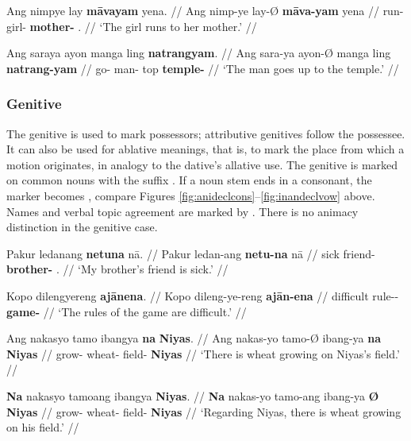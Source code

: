 \pex
\a\label{ex:datloc}\begingl
	\gla Ang nimpye lay \textbf{māvayam} yena. //
	\glb Ang nimp-ye lay-Ø \textbf{māva-yam} yena //
	\glc \AgtT{} run-\TsgF{} girl-\Top{} \textbf{mother-\Dat{}} 
		\TsgF{}.\Gen{} //
	\glft `The girl runs to her mother.' //
\endgl

\a\label{ex:datlocprep}\begingl
	\gla Ang saraya ayon manga ling \textbf{natrangyam}. //
	\glb Ang sara-ya ayon-Ø manga ling \textbf{natrang-yam} //
	\glc \AgtT{} go-\TsgM{} man-\Top{} \Dyn{} top \textbf{temple-\Dat{}} //
	\glft `The man goes up to the temple.' //
\endgl

\xe


\subsubsection{Genitive}
\label{subsubsec:genitive}

The genitive is used to mark possessors; attributive genitives follow the 
possessee. It can also be used for ablative meanings, that is, to mark the 
place from which a motion originates, in analogy to the dative's allative use. 
The genitive is marked on common nouns with the suffix . If a 
noun stem ends in a consonant, the marker becomes , compare 
Figures \ref{fig:anideclcons}–\ref{fig:inandeclvow} above. Names and verbal 
topic agreement are marked by . There is no animacy distinction in 
the genitive case.

\pex
\a\begingl
	\gla Pakur ledanang \textbf{netuna} nā. //
	\glb Pakur ledan-ang \textbf{netu-na} nā //
	\glc sick friend-\Aarg{} \textbf{brother-\Gen{}} \Fsg{}.\Gen{} //
	\glft `My brother's friend is sick.' //
\endgl

\a\begingl
	\gla Kopo dilengyereng \textbf{ajānena}. //
	\glb Kopo dileng-ye-reng \textbf{ajān-ena} //
	\glc difficult rule-\Pl{}-\AargI{} \textbf{game-\Gen{}} //
	\glft `The rules of the game are difficult.' //
\endgl

\a\begingl
	\gla Ang nakasyo tamo ibangya \textbf{na} \textbf{Niyas}. //
	\glb Ang nakas-yo tamo-Ø ibang-ya \textbf{na} \textbf{Niyas} //
	\glc \AgtT{} grow-\TsgN{} wheat-\Top{} field-\Loc{} \textbf{\Gen} 
		\textbf{Niyas} //
	\glft `There is wheat growing on Niyas's field.' //
\endgl

\a\begingl
	\gla \textbf{Na} nakasyo tamoang ibangya \textbf{{}} \textbf{Niyas}. //
	\glb \textbf{Na} nakas-yo tamo-ang ibang-ya \textbf{Ø} \textbf{Niyas} //
	\glc \textbf{\GenT{}} grow-\TsgN{} wheat-\Aarg{} field-\Loc{} 
		\textbf{\Top} \textbf{Niyas} //
	\glft `Regarding Niyas, there is wheat growing on his field.' //
\endgl

